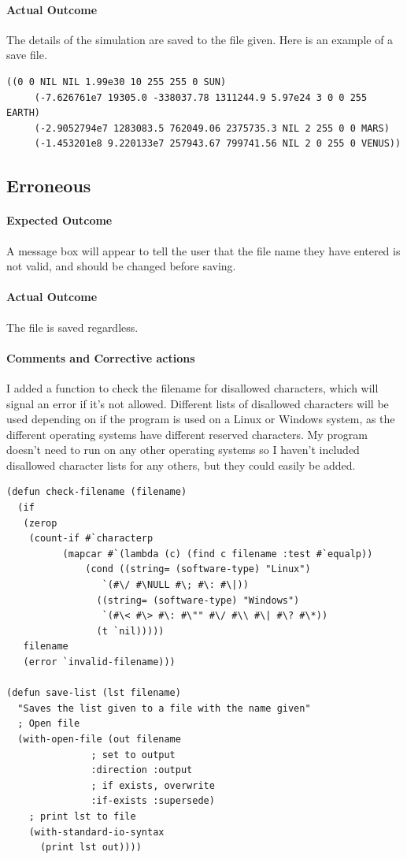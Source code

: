 \paragraph{Actual Outcome}
The details of the simulation are saved to the file given. Here is an example of
a save file.
\begin{lstlisting}[numbers=none]
	((0 0 NIL NIL 1.99e30 10 255 255 0 SUN) 
	 (-7.626761e7 19305.0 -338037.78 1311244.9 5.97e24 3 0 0 255 EARTH) 
	 (-2.9052794e7 1283083.5 762049.06 2375735.3 NIL 2 255 0 0 MARS) 
	 (-1.453201e8 9.220133e7 257943.67 799741.56 NIL 2 0 255 0 VENUS)) 
\end{lstlisting}

\subsection{Erroneous}
\paragraph{Expected Outcome}
A message box will appear to tell the user that the file name they have entered
is not valid, and should be changed before saving.
\paragraph{Actual Outcome}
The file is saved regardless.
\paragraph{Comments and Corrective actions}
I added a function to check the filename for disallowed characters, which will
signal an error if it's not allowed. Different lists of disallowed characters
will be used depending on if the program is used on a Linux or Windows system,
as the different operating systems have different reserved characters. My
program doesn't need to run on any other operating systems so I haven't included
disallowed character lists for any others, but they could easily be added.
\begin{lstlisting}
(defun check-filename (filename)
  (if 
   (zerop
    (count-if #`characterp
	      (mapcar #`(lambda (c) (find c filename :test #`equalp))
		      (cond ((string= (software-type) "Linux")
			     `(#\/ #\NULL #\; #\: #\|))
			    ((string= (software-type) "Windows")
			     `(#\< #\> #\: #\"" #\/ #\\ #\| #\? #\*))
			    (t `nil)))))
   filename
   (error `invalid-filename)))

(defun save-list (lst filename)
  "Saves the list given to a file with the name given"
  ; Open file
  (with-open-file (out filename 
		       ; set to output
		       :direction :output 
		       ; if exists, overwrite
		       :if-exists :supersede) 
    ; print lst to file
    (with-standard-io-syntax
      (print lst out)))) 
\end{lstlisting}

